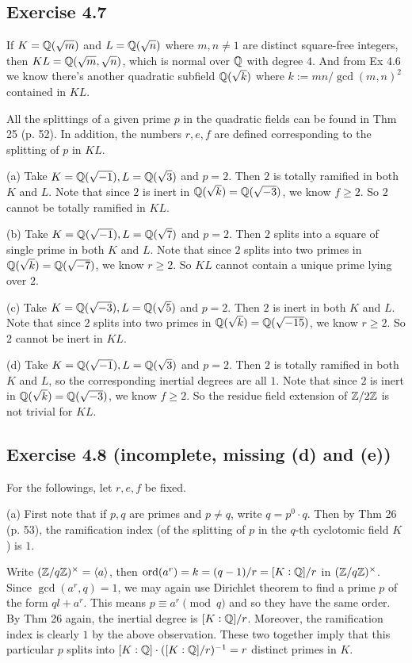 \documentclass[../Marcus.tex]{subfiles}
\begin{document}
\subsection*{Exercise 4.7}

If $K=\mathbb{Q}(\sqrt{m})$ and $L=\mathbb{Q}(\sqrt{n})$ where $m,n\neq 1$ are distinct square-free integers, then $KL=\mathbb{Q}(\sqrt{m},\sqrt{n})$, which is normal over $\mathbb{Q}$ with degree $4$. And from Ex 4.6 we know there's another quadratic subfield $\mathbb{Q}(\sqrt{k})$ where $k:=mn/\gcd(m,n)^2$ contained in $KL$.

All the splittings of a given prime $p$ in the quadratic fields can be found in Thm 25 (p. 52). In addition, the numbers $r,e,f$ are defined corresponding to the splitting of $p$ in $KL$.

(a) Take $K=\mathbb{Q}(\sqrt{-1}),L=\mathbb{Q}(\sqrt{3})$ and $p=2$. Then $2$ is totally ramified in both $K$ and $L$. Note that since $2$ is inert in $\mathbb{Q}(\sqrt{k})=\mathbb{Q}(\sqrt{-3})$, we know $f\geq 2$. So $2$ cannot be totally ramified in $KL$.

(b) Take $K=\mathbb{Q}(\sqrt{-1}),L=\mathbb{Q}(\sqrt{7})$ and $p=2$. Then $2$ splits into a square of single prime in both $K$ and $L$. Note that since $2$ splits into two primes in $\mathbb{Q}(\sqrt{k})=\mathbb{Q}(\sqrt{-7})$, we know $r\geq 2$. So $KL$ cannot contain a unique prime lying over $2$.

(c) Take $K=\mathbb{Q}(\sqrt{-3}),L=\mathbb{Q}(\sqrt{5})$ and $p=2$. Then $2$ is inert in both $K$ and $L$. Note that since $2$ splits into two primes in $\mathbb{Q}(\sqrt{k})=\mathbb{Q}(\sqrt{-15})$, we know $r\geq 2$. So $2$ cannot be inert in $KL$.

(d) Take $K=\mathbb{Q}(\sqrt{-1}),L=\mathbb{Q}(\sqrt{3})$ and $p=2$. Then $2$ is totally ramified in both $K$ and $L$, so the corresponding inertial degrees are all $1$. Note that since $2$ is inert in $\mathbb{Q}(\sqrt{k})=\mathbb{Q}(\sqrt{-3})$, we know $f\geq 2$. So the residue field extension of $\mathbb{Z}/2\mathbb{Z}$ is not trivial for $KL$.

\subsection*{Exercise 4.8 \color{red}(incomplete, missing (d) and (e))}

For the followings, let $r,e,f$ be fixed.

(a) First note that if $p,q$ are primes and $p\neq q$, write $q=p^0\cdot q$. Then by Thm 26 (p. 53), the ramification index (of the splitting of $p$ in the $q$-th cyclotomic field $K$) is $1$.

Write $(\mathbb{Z}/q\mathbb{Z})^\times=\langle a\rangle$, then $\operatorname{ord}(a^r)=k=(q-1)/r=[K:\mathbb{Q}]/r$ in $(\mathbb{Z}/q\mathbb{Z})^\times$. Since $\gcd(a^r,q)=1$, we may again use Dirichlet theorem to find a prime $p$ of the form $ql+a^r$. This means $p\equiv a^r \pmod{q}$ and so they have the same order. By Thm 26 again, the inertial degree is $[K:\mathbb{Q}]/r$. Moreover, the ramification index is clearly $1$ by the above observation. These two together imply that this particular $p$ splits into $[K:\mathbb{Q}]\cdot([K:\mathbb{Q}]/r)^{-1}=r$ distinct primes in $K$.
\end{document}
